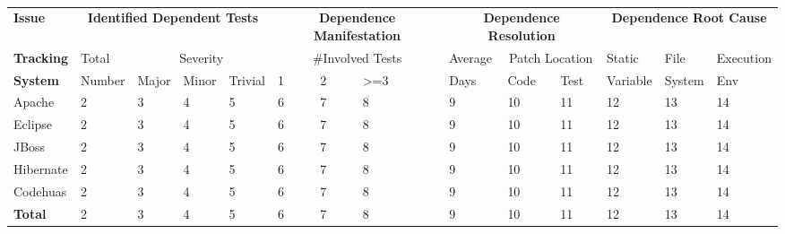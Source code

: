 \begin{table*}[t]
\vspace{1mm}
\centering
\small{
\setlength{\tabcolsep}{.60\tabcolsep}
\begin{tabular}{|l||l|l|l|l||l|l|l||l|l|l||l|l|l|}
\hline
\textbf{Issue}&\multicolumn{4}{|c||}{\textbf{Identified Dependent Tests}}&\multicolumn{3}{|c||}{\textbf{Dependence Manifestation}}&\multicolumn{3}{|c||}{\textbf{Dependence Resolution}}&\multicolumn{3}{|c|}{\textbf{Dependence Root Cause}}\\
\cline{2-5}\cline{9-14}
\textbf{Tracking} &Total&\multicolumn{3}{|c||}{Severity}&\multicolumn{3}{|c||}{\#Involved Tests}&
Average&\multicolumn{2}{|c||}{Patch Location}&Static&File & Execution\\
\cline{3-8}\cline{10-11}
\textbf{System}&Number&Major&Minor&Trivial&1&2&>=3&Days&Code&Test&Variable&System&Env\\
\hline
Apache&2&3&4&5&6&7&8&9&10&11&12&13&14\\
\hline
Eclipse&2&3&4&5&6&7&8&9&10&11&12&13&14\\
\hline
JBoss&2&3&4&5&6&7&8&9&10&11&12&13&14\\
\hline
Hibernate&2&3&4&5&6&7&8&9&10&11&12&13&14\\
\hline
Codehuas&2&3&4&5&6&7&8&9&10&11&12&13&14\\
\hline
\hline
\textbf{Total} &2&3&4&5&6&7&8&9&10&11&12&13&14\\
\hline
\end{tabular}
}
\vspace{-2mm}
\caption{{\label{tab:studyresults} }
}
\end{table*}
